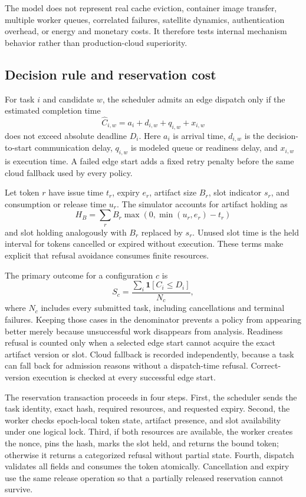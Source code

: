 \documentclass[conference]{IEEEtran}
\begin{document}
The model does not represent real cache eviction, container image transfer, multiple worker queues, correlated failures, satellite dynamics, authentication overhead, or energy and monetary costs. It therefore tests internal mechanism behavior rather than production-cloud superiority.

\subsection{Decision rule and reservation cost}

For task $i$ and candidate $w$, the scheduler admits an edge dispatch only if the
estimated completion time
\begin{equation}
 \widehat{C}_{i,w}=a_i+d_{i,w}+q_{i,w}+x_{i,w}
 \label{eq:completion}
\end{equation}
does not exceed absolute deadline $D_i$. Here $a_i$ is arrival time, $d_{i,w}$
is the decision-to-start communication delay, $q_{i,w}$ is modeled queue or
readiness delay, and $x_{i,w}$ is execution time. A failed edge start adds a
fixed retry penalty before the same cloud fallback used by every policy.

Let token $r$ have issue time $t_r$, expiry $e_r$, artifact size $B_r$, slot
indicator $s_r$, and consumption or release time $u_r$. The simulator accounts
for artifact holding as
\begin{equation}
 H_B=\sum_r B_r\max(0,\min(u_r,e_r)-t_r)
\end{equation}
and slot holding analogously with $B_r$ replaced by $s_r$. Unused slot time is
the held interval for tokens cancelled or expired without execution. These terms
make explicit that refusal avoidance consumes finite resources.

The primary outcome for a configuration $c$ is
\begin{equation}
 S_c=\frac{\sum_i \mathbf{1}[C_i\leq D_i]}{N_c},
\end{equation}
where $N_c$ includes every submitted task, including cancellations and terminal
failures. Keeping those cases in the denominator prevents a policy from appearing
better merely because unsuccessful work disappears from analysis. Readiness
refusal is counted only when a selected edge start cannot acquire the exact
artifact version or slot. Cloud fallback is recorded independently, because a task
can fall back for admission reasons without a dispatch-time refusal. Correct-version
execution is checked at every successful edge start.

The reservation transaction proceeds in four steps. First, the scheduler sends
the task identity, exact hash, required resources, and requested expiry. Second,
the worker checks epoch-local token state, artifact presence, and slot availability
under one logical lock. Third, if both resources are available, the worker creates
the nonce, pins the hash, marks the slot held, and returns the bound token; otherwise
it returns a categorized refusal without partial state. Fourth, dispatch validates
all fields and consumes the token atomically. Cancellation and expiry use the same
release operation so that a partially released reservation cannot survive.
\end{document}
